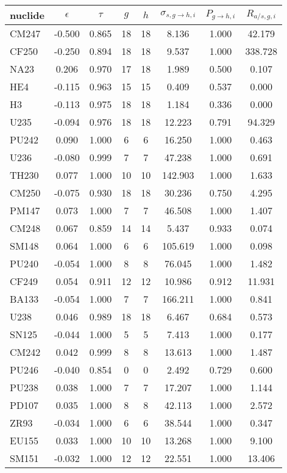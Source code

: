\begin{tabular}{|l|ccccccc|}
\hline
nuclide & $\epsilon$ & $\tau$ & $g$ & $h$ & $\sigma_{s,g\to h,i}$ & $P_{g\to h,i}$ & $R_{a/s,g,i}$\\
\hline
CM247 & -0.500 & 0.865 & 18 & 18 & 8.136 & 1.000 & 42.179\\
CF250 & -0.250 & 0.894 & 18 & 18 & 9.537 & 1.000 & 338.728\\
NA23 & 0.206 & 0.970 & 17 & 18 & 1.989 & 0.500 & 0.107\\
HE4 & -0.115 & 0.963 & 15 & 15 & 0.409 & 0.537 & 0.000\\
H3 & -0.113 & 0.975 & 18 & 18 & 1.184 & 0.336 & 0.000\\
U235 & -0.094 & 0.976 & 18 & 18 & 12.223 & 0.791 & 94.329\\
PU242 & 0.090 & 1.000 & 6 & 6 & 16.250 & 1.000 & 0.463\\
U236 & -0.080 & 0.999 & 7 & 7 & 47.238 & 1.000 & 0.691\\
TH230 & 0.077 & 1.000 & 10 & 10 & 142.903 & 1.000 & 1.633\\
CM250 & -0.075 & 0.930 & 18 & 18 & 30.236 & 0.750 & 4.295\\
PM147 & 0.073 & 1.000 & 7 & 7 & 46.508 & 1.000 & 1.407\\
CM248 & 0.067 & 0.859 & 14 & 14 & 5.437 & 0.933 & 0.074\\
SM148 & 0.064 & 1.000 & 6 & 6 & 105.619 & 1.000 & 0.098\\
PU240 & -0.054 & 1.000 & 8 & 8 & 76.045 & 1.000 & 1.482\\
CF249 & 0.054 & 0.911 & 12 & 12 & 10.986 & 0.912 & 11.931\\
BA133 & -0.054 & 1.000 & 7 & 7 & 166.211 & 1.000 & 0.841\\
U238 & 0.046 & 0.989 & 18 & 18 & 6.467 & 0.684 & 0.573\\
SN125 & -0.044 & 1.000 & 5 & 5 & 7.413 & 1.000 & 0.177\\
CM242 & 0.042 & 0.999 & 8 & 8 & 13.613 & 1.000 & 1.487\\
PU246 & -0.040 & 0.854 & 0 & 0 & 2.492 & 0.729 & 0.600\\
PU238 & 0.038 & 1.000 & 7 & 7 & 17.207 & 1.000 & 1.144\\
PD107 & 0.035 & 1.000 & 8 & 8 & 42.113 & 1.000 & 2.572\\
ZR93 & -0.034 & 1.000 & 6 & 6 & 38.544 & 1.000 & 0.347\\
EU155 & 0.033 & 1.000 & 10 & 10 & 13.268 & 1.000 & 9.100\\
SM151 & -0.032 & 1.000 & 12 & 12 & 22.551 & 1.000 & 13.406\\

\end{tabular}
